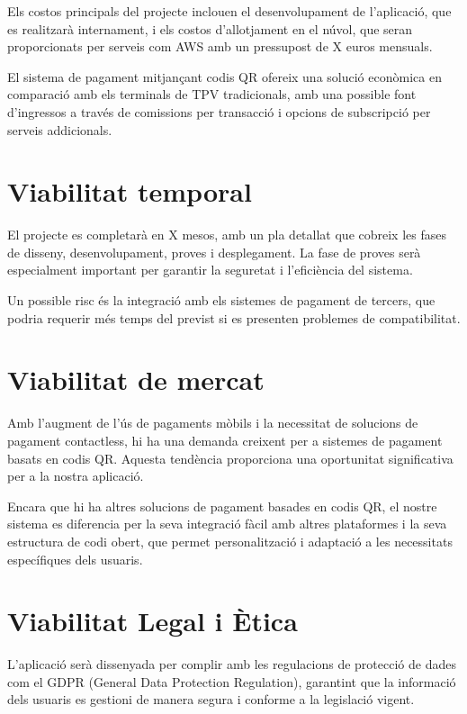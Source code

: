 \documentclass[a4paper,12pt,twoside]{ThesisStyle}
\begin{document}
Els costos principals del projecte inclouen el desenvolupament de l'aplicació, que es realitzarà internament, i els costos d'allotjament en el núvol, que seran proporcionats per serveis com AWS amb un pressupost de X euros mensuals.

El sistema de pagament mitjançant codis QR ofereix una solució econòmica en comparació amb els terminals de TPV tradicionals, amb una possible font d'ingressos a través de comissions per transacció i opcions de subscripció per serveis addicionals.


\section{Viabilitat temporal}
\label{subsec:Viabilitat temporal}

El projecte es completarà en X mesos, amb un pla detallat que cobreix les fases de disseny, desenvolupament, proves i desplegament. La fase de proves serà especialment important per garantir la seguretat i l'eficiència del sistema.

Un possible risc és la integració amb els sistemes de pagament de tercers, que podria requerir més temps del previst si es presenten problemes de compatibilitat.


\section{Viabilitat de mercat}
\label{subsec:Viabilitat de mercat}

Amb l'augment de l'ús de pagaments mòbils i la necessitat de solucions de pagament contactless, hi ha una demanda creixent per a sistemes de pagament basats en codis QR. Aquesta tendència proporciona una oportunitat significativa per a la nostra aplicació.

Encara que hi ha altres solucions de pagament basades en codis QR, el nostre sistema es diferencia per la seva integració fàcil amb altres plataformes i la seva estructura de codi obert, que permet personalització i adaptació a les necessitats específiques dels usuaris.

\section{Viabilitat Legal i Ètica}
\label{subsec:Viabilitat Legal i Ètica}

L'aplicació serà dissenyada per complir amb les regulacions de protecció de dades com el GDPR (General Data Protection Regulation), garantint que la informació dels usuaris es gestioni de manera segura i conforme a la legislació vigent.
\end{document}

